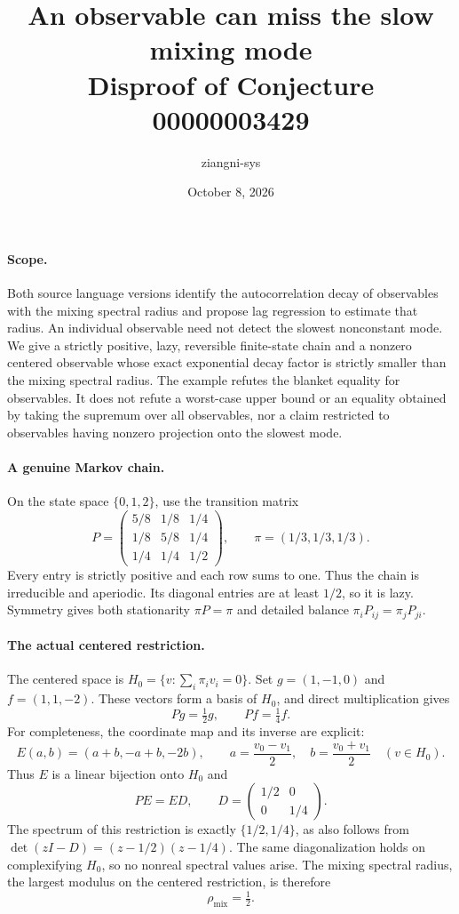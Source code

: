 \documentclass[11pt]{article}
\title{An observable can miss the slow mixing mode\\Disproof of Conjecture 00000003429}
\author{ziangni-sys}
\date{October 8, 2026}
\begin{document}
\maketitle

\paragraph{Scope.}
Both source language versions identify the autocorrelation decay of
observables with the mixing spectral radius and propose lag regression
to estimate that radius. An individual observable need not detect the
slowest nonconstant mode. We give a strictly positive, lazy, reversible
finite-state chain and a nonzero centered observable whose exact
exponential decay factor is strictly smaller than the mixing spectral
radius. The example refutes the blanket equality for observables.
It does not refute a worst-case upper bound or an equality obtained by
taking the supremum over all observables, nor a claim restricted to
observables having nonzero projection onto the slowest mode.

\paragraph{A genuine Markov chain.}
On the state space $\{0,1,2\}$, use the transition matrix
\[
 P=\begin{pmatrix}
 5/8&1/8&1/4\\
 1/8&5/8&1/4\\
 1/4&1/4&1/2
 \end{pmatrix},\qquad \pi=(1/3,1/3,1/3).
\]
Every entry is strictly positive and each row sums to one. Thus the chain
is irreducible and aperiodic. Its diagonal entries are at least $1/2$, so
it is lazy. Symmetry gives both stationarity $\pi P=\pi$ and detailed
balance $\pi_iP_{ij}=\pi_jP_{ji}$.

\paragraph{The actual centered restriction.}
The centered space is
$H_0=\{v:\sum_i\pi_i v_i=0\}$.
Set $g=(1,-1,0)$ and $f=(1,1,-2)$. These vectors form a basis of $H_0$,
and direct multiplication gives
\[
                   Pg=\tfrac12g,\qquad Pf=\tfrac14f.
\]
For completeness, the coordinate map and its inverse are explicit:
\[
 E(a,b)=(a+b,-a+b,-2b),\qquad
 a=\frac{v_0-v_1}{2},\quad b=\frac{v_0+v_1}{2}
       \quad(v\in H_0).
\]
Thus $E$ is a linear bijection onto $H_0$ and
\[
        PE=ED,\qquad D=\begin{pmatrix}1/2&0\\0&1/4\end{pmatrix}.
\]
The spectrum of this restriction is exactly $\{1/2,1/4\}$, as also follows
from $\det(zI-D)=(z-1/2)(z-1/4)$. The same diagonalization holds on
complexifying $H_0$, so no nonreal spectral values arise. The mixing
spectral radius, the largest modulus on the centered restriction, is
therefore
\[
                         \rho_{\mathrm{mix}}=\tfrac12.
\]
\end{document}
